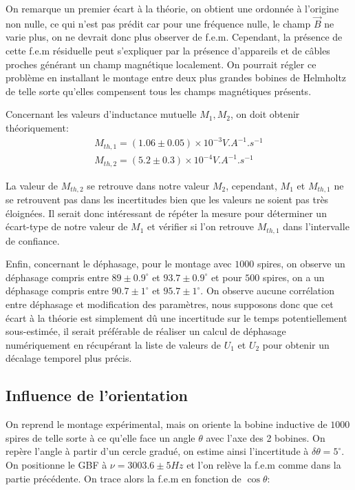 \documentclass[11pt]{article}
\begin{document}
On remarque un premier écart à la théorie, on obtient une ordonnée à l'origine non nulle, ce qui n'est pas prédit car pour une fréquence nulle, le champ $\vec{B}$
ne varie plus, on ne devrait donc plus observer de f.e.m. Cependant, la présence de cette f.e.m résiduelle peut s'expliquer par la présence d'appareils et de câbles proches
générant un champ magnétique localement. On pourrait régler ce problème en installant le montage entre deux plus grandes bobines de Helmholtz de telle sorte
qu'elles compensent tous les champs magnétiques présents.

Concernant les valeurs d'inductance mutuelle $M_1, M_2$, on doit obtenir théoriquement:
\begin{align*}
  M_{th,1} = (1.06 \pm 0.05) \times 10^{-3} V.A^{-1}.s^{-1} \\
  M_{th,2} = (5.2 \pm 0.3) \times 10^{-4} V.A^{-1}.s^{-1}
\end{align*}

La valeur de $M_{th,2}$ se retrouve dans notre valeur $M_2$, cependant, $M_1$ et $M_{th,1}$ ne se retrouvent pas dans les incertitudes bien que les valeurs ne soient pas 
très éloignées. Il serait donc intéressant de répéter la mesure pour déterminer un écart-type de notre valeur de $M_1$ et vérifier si l'on retrouve $M_{th,1}$ dans l'intervalle de confiance.

Enfin, concernant le déphasage, pour le montage avec $1000$ spires, on observe un déphasage compris entre $89 \pm 0.9 ^{\circ}$ et $93.7 \pm 0.9 ^{\circ}$ et pour $500$ spires, on a 
un déphasage compris entre $90.7 \pm 1 ^\circ$ et $95.7 \pm 1 ^\circ$. On observe aucune corrélation entre déphasage et modification des paramètres, nous supposons donc 
que cet écart à la théorie est simplement dû une incertitude sur le temps potentiellement sous-estimée, il serait préférable de réaliser un calcul de déphasage numériquement en récupérant
la liste de valeurs de $U_1$ et $U_2$ pour obtenir un décalage temporel plus précis.


\break
\subsection{Influence de l'orientation}
On reprend le montage expérimental, mais on oriente la bobine inductive de $1000$ spires de telle sorte à ce qu'elle face un angle $\theta$ avec l'axe des 2 bobines.
On repère l'angle à partir d'un cercle gradué, on estime ainsi l'incertitude à $\delta \theta = 5^{\circ}$. On positionne le GBF à $\nu = 3003.6 \pm 5 Hz$ et l'on relève la f.e.m
comme dans la partie précédente. On trace alors la f.e.m en fonction de $\cos \theta$:
\end{document}
